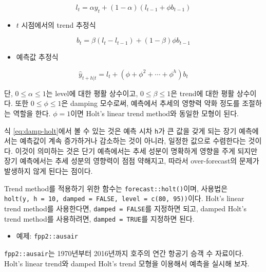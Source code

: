 \documentclass[
]{book}
\providecommand{\tightlist}{%
  \setlength{\itemsep}{0pt}\setlength{\parskip}{0pt}}
\begin{document}
\begin{equation}
l_{t} = \alpha y_{t} + (1-\alpha) (l_{t-1} + \phi b_{t-1}) 
\end{equation}

\begin{itemize}
\tightlist
\item
  \(t\) 시점에서의 trend 추정식
\end{itemize}

\begin{equation}
b_{t} = \beta (l_{t} - l_{t-1}) + (1-\beta) \phi b_{t-1}
\end{equation}

\begin{itemize}
\tightlist
\item
  예측값 추정식
\end{itemize}

\begin{equation}
\hat{y}_{t+h|t} = l_{t} + (\phi + \phi^{2} + \cdots + \phi^{h}) b_{t} \label{eq:damp-holt}
\end{equation}

단, \(0 \leq \alpha \leq 1\)는 level에 대한 평활 상수이고, \(0 \leq \beta \leq 1\)은 trend에 대한 평활 상수이다. 또한 \(0 \leq \phi \leq 1\)은 damping 모수로써, 예측에서 추세의 영향력 약화 정도를 조절하는 역할을 한다. \(\phi = 1\)이면 Holt's linear trend method와 동일한 모형이 된다.

식 \eqref{eq:damp-holt}에서 볼 수 있는 것은 예측 시차 \texttt{h}가 큰 값을 갖게 되는 장기 예측에서는 예측값이 계속 증가하거나 감소하는 것이 아니라, 일정한 값으로 수렴한다는 것이다. 이것이 의미하는 것은 단기 예측에서는 추세 성분이 명확하게 영향을 주게 되지만 장기 예측에서는 추세 성분의 영향력이 점점 약해지고, 따라서 over-forecast의 문제가 발생하지 않게 된다는 점이다.

Trend method를 적용하기 위한 함수는 \texttt{forecast::holt()}이며, 사용법은 \texttt{holt(y,\ h\ =\ 10,\ damped\ =\ FALSE,\ level\ =\ c(80,\ 95))}이다. Holt's linear trend method를 사용한다면, \texttt{damped\ =\ FALSE}를 지정하면 되고, damped Holt's trend method를 사용하려면, \texttt{damped\ =\ TRUE}를 지정하면 된다.

\begin{itemize}
\tightlist
\item
  예제: \texttt{fpp2::ausair}
\end{itemize}

\texttt{fpp2::ausair}는 1970년부터 2016년까지 호주의 연간 항공기 승객 수 자료이다. Holt's linear trend와 damped Holt's trend 모형을 이용해서 예측을 실시해 보자.
\end{document}
